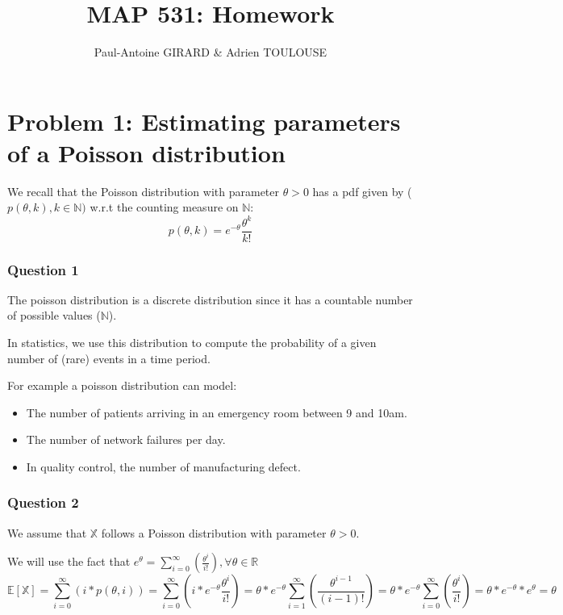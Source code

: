 \documentclass[]{article}
\title{MAP 531: Homework}
\author{Paul-Antoine GIRARD \& Adrien TOULOUSE}
\date{}
\begin{document}
\maketitle

\hypertarget{problem-1-estimating-parameters-of-a-poisson-distribution}{%
\section{Problem 1: Estimating parameters of a Poisson
distribution}\label{problem-1-estimating-parameters-of-a-poisson-distribution}}

We recall that the Poisson distribution with parameter \(\theta > 0\)
has a pdf given by (\(p(\theta, k), k \in \mathbb{N})\) w.r.t the
counting measure on \(\mathbb{N}\):\\
\[p(\theta, k) = e^{-\theta} \frac{\theta^k}{k!}\]

\hypertarget{question-1}{%
\subsubsection{Question 1}\label{question-1}}

The poisson distribution is a discrete distribution since it has a
countable number of possible values (\(\mathbb{N}\)).

In statistics, we use this distribution to compute the probability of a
given number of (rare) events in a time period.

For example a poisson distribution can model:

\begin{itemize}
\item
  The number of patients arriving in an emergency room between 9 and
  10am.
\item
  The number of network failures per day.
\item
  In quality control, the number of manufacturing defect.
\end{itemize}

\hypertarget{question-2}{%
\subsubsection{Question 2}\label{question-2}}

We assume that \(\mathbb{X}\) follows a Poisson distribution with
parameter \(\theta > 0\).

We will use the fact that
\(e^{\theta} = \sum_{i=0}^{\infty} (\frac{\theta^{i}}{i!}), \forall \theta \in \mathbb{R}\)
\[
\mathbb{E}[\mathbb{X}] = \sum_{i=0}^{\infty} (i * p(\theta, i)) = \sum_{i=0}^{\infty} (i*e^{-\theta} \frac{\theta^{i}}{i!}) = \theta * e^{-\theta}\sum_{i=1}^{\infty} (\frac{\theta^{i-1}}{(i-1)!}) = \theta * e^{-\theta} \sum_{i=0}^{\infty} (\frac{\theta^{i}}{i!}) = \theta * e^{-\theta} * e^{\theta} = \theta  
\]
\end{document}
